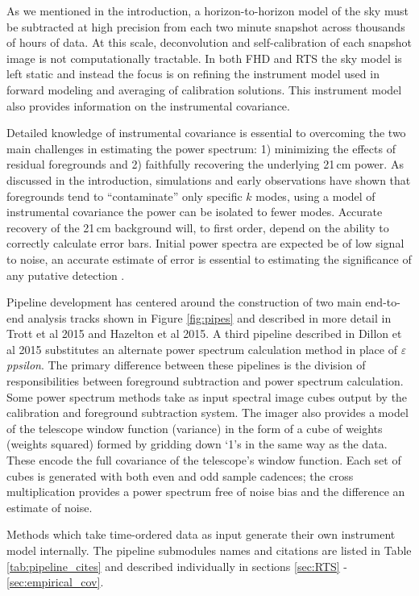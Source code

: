\documentclass[twolcolumn,iop]{emulateapj}
\def\eppsilon{{\it $\varepsilon$ppsilon}}
\def\chipscite{Trott et al 2015}
\def\eppsiloncite{Hazelton et al 2015}
\def\dilloncite{Dillon et al 2015 }
\begin{document}
As we mentioned in the introduction, a horizon-to-horizon model of the sky must be subtracted at high precision from each two minute snapshot across thousands of hours of data. At this scale, deconvolution and self-calibration of each snapshot image is not computationally tractable.  In both FHD and RTS the sky model is left static and instead the focus is on refining the instrument model used in forward modeling and averaging of calibration solutions.  This instrument model also provides information on the instrumental covariance.


Detailed knowledge of instrumental covariance is essential to overcoming the two main challenges in estimating the power spectrum: 1) minimizing the effects of residual foregrounds and 2) faithfully recovering the underlying 21\,cm power.   As discussed in the introduction, simulations and early observations have shown that foregrounds tend to ``contaminate'' only specific $k$ modes, using a model of instrumental covariance the power can be isolated to fewer modes.  Accurate recovery of the 21\,cm background will, to first order, depend on the ability to correctly calculate error bars.  Initial power spectra are expected be of low signal to noise, an accurate estimate of error is essential to estimating the significance of any putative detection \citep{Pober:2014p10390,Beardsley:2013p9952}. 

Pipeline development has centered around the construction of two main end-to-end analysis tracks shown in Figure \ref{fig:pipes} and described in more detail in \chipscite{} and \eppsiloncite{}. A third pipeline described in \dilloncite{} substitutes an alternate power spectrum calculation method in place of \eppsilon{}. The primary difference between these pipelines is the division of responsibilities between foreground subtraction and power spectrum calculation. Some power spectrum methods take as input spectral image cubes output by the calibration and foreground subtraction system.  The imager also provides a model of the telescope window function (variance) in the form of a cube of weights (weights squared) formed by gridding down `1's in the same way as the data. These encode the full covariance of the telescope's window function.  Each set of cubes is generated with both even and odd sample cadences; the cross multiplication provides a power spectrum free of noise bias and the difference an estimate of noise.

Methods which take time-ordered data as input generate their own instrument model internally.  The pipeline submodules names and citations are listed in Table \ref{tab:pipeline_cites} and described individually in sections \ref{sec:RTS} - \ref{sec:empirical_cov}.  
\end{document}
